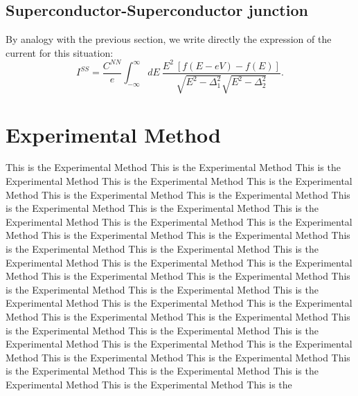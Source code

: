 \documentclass[twocolumn, twoside,a4paper,10pt]{article}
\begin{document}
\subsection{Superconductor-Superconductor junction} 
By analogy with the previous section, we write directly the expression of the current for this situation:
\begin{equation}\label{ins}
I^{SS} = \frac{C^{NN}}{e} \int_{-\infty}^{\infty} dE\ 
		\frac{E^2\ [f(E-eV)-f(E)]}{\sqrt{E^2-\Delta_1^2}\sqrt{E^2-\Delta_2^2}}.
\end{equation}


\section{Experimental Method}
This is the Experimental Method This is the Experimental Method This is the Experimental Method This is the Experimental Method This is the Experimental Method This is the Experimental Method This is the Experimental Method This is the Experimental Method This is the Experimental Method This is the Experimental Method This is the Experimental Method This is the Experimental Method This is the Experimental Method This is the Experimental Method This is the Experimental Method This is the Experimental Method This is the Experimental Method This is the Experimental Method This is the Experimental Method This is the Experimental Method This is the Experimental Method This is the Experimental Method This is the Experimental Method This is the Experimental Method This is the Experimental Method This is the Experimental Method This is the Experimental Method This is the Experimental Method This is the Experimental Method This is the Experimental Method This is the Experimental Method This is the Experimental Method This is the Experimental Method This is the Experimental Method This is the Experimental Method This is the Experimental Method This is the Experimental Method This is the Experimental Method This is the Experimental Method This is the 
\end{document}
